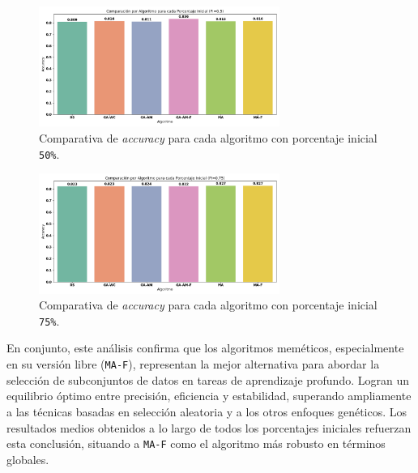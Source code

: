 \begin{figure}[htp]
  \centering
  \includegraphics[width=0.7\textwidth]{imagenes/evaluaciones/final/barplot-por-pi/pi-50.png}
  \caption{Comparativa de \textit{accuracy} para cada algoritmo con porcentaje inicial \texttt{50\%}.}
  \label{fig:barplot-por-pi-50}
\end{figure}

\begin{figure}[htp]
  \centering
  \includegraphics[width=0.7\textwidth]{imagenes/evaluaciones/final/barplot-por-pi/pi-75.png}
  \caption{Comparativa de \textit{accuracy} para cada algoritmo con porcentaje inicial \texttt{75\%}.}
  \label{fig:barplot-por-pi-75}
\end{figure}

En conjunto, este análisis confirma que los algoritmos meméticos, especialmente en su versión libre (\texttt{MA-F}),
representan la mejor alternativa para abordar la selección de subconjuntos de datos en tareas de aprendizaje profundo.
Logran un equilibrio óptimo entre precisión, eficiencia y estabilidad, superando ampliamente a las técnicas basadas en selección aleatoria y a los otros enfoques genéticos.
Los resultados medios obtenidos a lo largo de todos los porcentajes iniciales refuerzan esta conclusión, situando a \texttt{MA-F} como el algoritmo más robusto en términos globales.

